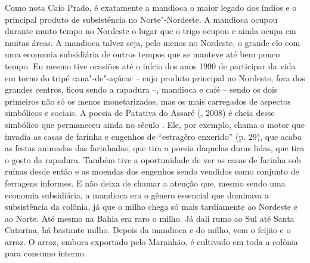Como nota Caio Prado, é exatamente a mandioca o maior legado dos índios
e o principal produto de subsistência no Norte"-Nordeste. A mandioca
ocupou durante muito tempo no Nordeste o lugar que o trigo ocupou e
ainda ocupa em muitas áreas. A mandioca talvez seja, pelo menos no
Nordeste, o grande elo com uma economia subsidiária de outros tempos que
se manteve até bem pouco tempo. Eu mesmo tive ocasiões até o início dos
anos 1990 de participar da vida em torno do tripé cana"-de"-açúcar -- cujo
produto principal no Nordeste, fora dos grandes centros, ficou sendo a
rapadura --, mandioca e café -- sendo os dois primeiros não só os menos
monetarizados, mas os mais carregados de aspectos simbólicos e sociais.
A poesia de Patativa do Assaré (, 2008) é cheia desse simbólico
que permaneceu ainda no século . Ele, por exemplo, chama o motor que
invadia as casas de farinha e engenhos de ``estragêro enxerido'' (p.
29), que acaba as festas animadas das farinhadas, que tira a poesia
daquelas duras lidas, que tira o gosto da rapadura. Também tive a
oportunidade de ver as casas de farinha sob ruínas desde então e as
moendas dos engenhos sendo vendidos como conjunto de ferragens informes.
E não deixa de chamar a atenção que, mesmo sendo uma economia
subsidiária, a mandioca era o gênero essencial que dominava a
subsistência da colônia, já que o milho chega só mais tardiamente ao
Nordeste e ao Norte. Até mesmo na Bahia era raro o milho. Já dali rumo
ao Sul até Santa Catarina, há bastante milho. Depois da mandioca e do
milho, vem o feijão e o arroz. O arroz, embora exportado pelo Maranhão,
é cultivado em toda a colônia para consumo interno.

